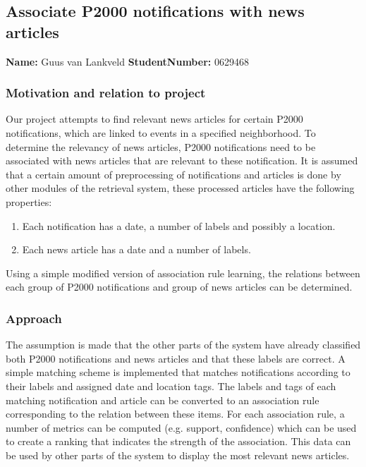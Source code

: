 \subsection{Associate P2000 notifications with news articles}
\textbf{Name:}  Guus van Lankveld \indent \textbf{StudentNumber:} 0629468

\subsubsection*{Motivation and relation to project}
Our project attempts to find relevant news articles for certain P2000 notifications, which are linked to events in a specified neighborhood. To determine the relevancy of news articles, P2000 notifications need to be associated with news articles that are relevant to these notification. It is assumed that a certain amount of preprocessing of notifications and articles is done by other modules of the retrieval system, these processed articles have the following properties:
\begin{enumerate}
\item Each notification has a date, a number of labels and possibly a location.
\item Each news article has a date and a number of labels.
\end{enumerate}
Using a simple modified version of association rule learning, the relations between each group of P2000 notifications and group of news articles can be determined.  

\subsubsection*{Approach}
The assumption is made that the other parts of the system have already classified both P2000 notifications and news articles and that these labels are correct. A simple matching scheme is implemented that matches notifications according to their labels and assigned date and location tags. The labels and tags of each matching notification and article can be converted to an association rule corresponding to the relation between these items. For each association rule, a number of metrics can be computed (e.g. support, confidence) which can be used to create a ranking that indicates the strength of the association. This data can be used by other parts of the system to display the most relevant news articles.

